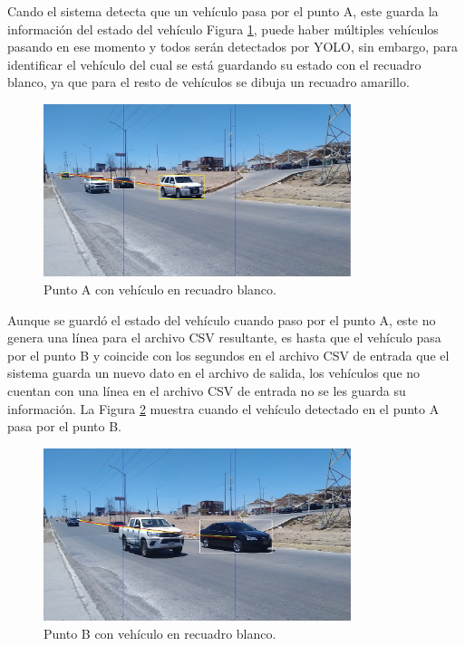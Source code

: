 Cando el sistema detecta que un vehículo pasa por el punto A, este guarda la información del estado del vehículo Figura \ref{fig:PuntoA}, puede haber múltiples vehículos pasando en ese momento y todos serán detectados por YOLO, sin embargo, para identificar el vehículo del cual se está guardando su estado con el recuadro blanco, ya que para el resto de vehículos se dibuja un recuadro amarillo.

\begin{figure}[H]
    \centering
    \includegraphics[width=0.8\textwidth]{Metodologia/imgs/Punto_A.jpg}
    \caption{Punto A con vehículo en recuadro blanco.}
    \label{fig:PuntoA}
\end{figure}

Aunque se guardó el estado del vehículo cuando paso por el punto A, este no genera una línea para el archivo CSV resultante, es hasta que el vehículo pasa por el punto B y coincide con los segundos en el archivo CSV de entrada que el sistema guarda un nuevo dato en el archivo de salida, los vehículos que no cuentan con una línea en el archivo CSV de entrada no se les guarda su información. La Figura \ref{fig:PuntoB} muestra cuando el vehículo detectado en el punto A pasa por el punto B.

\begin{figure}[H]
    \centering
    \includegraphics[width=0.8\textwidth]{Metodologia/imgs/Punto_B.jpg}
    \caption{Punto B con vehículo en recuadro blanco.}
    \label{fig:PuntoB}
\end{figure}

